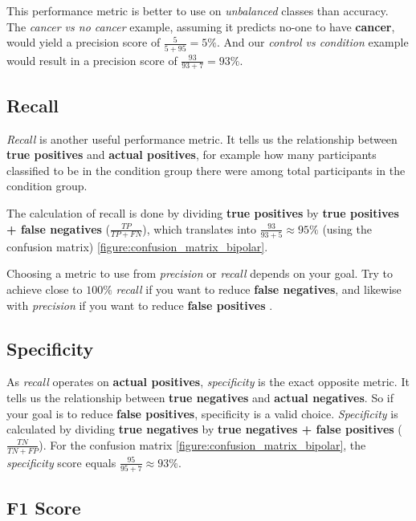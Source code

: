 This performance metric is better to use on \textit{unbalanced} classes than accuracy. The \textit{cancer vs no cancer} example, assuming it predicts no-one to have \textbf{cancer}, would yield a precision score of $ \frac{5}{5+95} = 5\% $. And our \textit{control vs condition} example would result in a precision score of $ \frac{93}{93+7} = 93\% $.

\subsection{Recall}

\textit{Recall} is another useful performance metric. It tells us the relationship between \textbf{true positives} and \textbf{actual positives}, for example how many participants classified to be in the condition group there were among total participants in the condition group.

The calculation of recall is done by dividing \textbf{true positives} by \textbf{true positives + false negatives} ($ \frac{TP}{TP+FN} $), which translates into $ \frac{93}{93+5} \approx 95\% $ (using the confusion matrix) \ref{figure:confusion_matrix_bipolar}.

Choosing a metric to use from \textit{precision} or \textit{recall} depends on your goal. Try to achieve close to $ 100\% $ \textit{recall} if you want to reduce \textbf{false negatives}, and likewise with \textit{precision} if you want to reduce \textbf{false positives} \cite{ml_metrics}.

\subsection{Specificity}

As \textit{recall} operates on \textbf{actual positives}, \textit{specificity} is the exact opposite metric. It tells us the relationship between \textbf{true negatives} and \textbf{actual negatives}. So if your goal is to reduce \textbf{false positives}, specificity is a valid choice. \textit{Specificity} is calculated by dividing \textbf{true negatives} by \textbf{true negatives + false positives} ($ \frac{TN}{TN+FP} $). For the confusion matrix \ref{figure:confusion_matrix_bipolar}, the \textit{specificity} score equals $ \frac{95}{95+7} \approx 93\% $.

\subsection{F1 Score}

